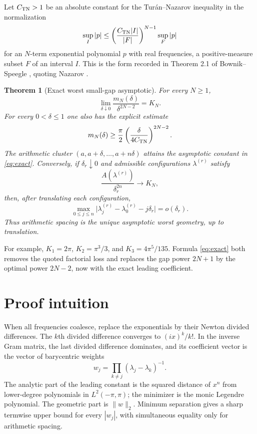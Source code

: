 \documentclass[11pt]{article}
\newtheorem{theorem}{Theorem}
\begin{document}
Let $C_{\rm TN}>1$ be an absolute constant for the Tur\'an--Nazarov inequality in the normalization
\begin{equation}\label{eq:TN}
 \sup_I |p|\leq
 \left(\frac{C_{\rm TN}|I|}{|F|}\right)^{N-1}\sup_F|p|
\end{equation}
for an $N$-term exponential polynomial $p$ with real frequencies, a positive-measure subset $F$ of an interval $I$.  This is the form recorded in Theorem 2.1 of Bownik--Speegle \cite{BownikSpeegle}, quoting Nazarov \cite{Nazarov}.

\begin{theorem}[Exact worst small-gap asymptotic]\label{thm:main}
For every $N\geq1$,
\begin{equation}\label{eq:exact}
 \boxed{\displaystyle
 \lim_{\delta\downarrow0}\frac{m_N(\delta)}{\delta^{2N-2}}
 =K_N.}
\end{equation}
For every $0<\delta\leq1$ one also has the explicit estimate
\begin{equation}\label{eq:explicit}
 m_N(\delta)\geq \frac{\pi}{2}
 \left(\frac{\delta}{4C_{\rm TN}}\right)^{2N-2}.
\end{equation}
The arithmetic cluster $(a,a+\delta,\ldots,a+n\delta)$ attains the asymptotic constant in \eqref{eq:exact}.  Conversely, if $\delta_r\downarrow0$ and admissible configurations $\lambda^{(r)}$ satisfy
\[
 \frac{A(\lambda^{(r)})}{\delta_r^{2n}}\longrightarrow K_N,
\]
then, after translating each configuration,
\begin{equation}\label{eq:rigidity}
 \max_{0\leq j\leq n}
 \bigl|\lambda_j^{(r)}-\lambda_0^{(r)}-j\delta_r\bigr|
 =o(\delta_r).
\end{equation}
Thus arithmetic spacing is the unique asymptotic worst geometry, up to translation.
\end{theorem}

For example, $K_1=2\pi$, $K_2=\pi^3/3$, and $K_3=4\pi^5/135$.  Formula \eqref{eq:exact} both removes the quoted factorial loss and replaces the gap power $2N+1$ by the optimal power $2N-2$, now with the exact leading coefficient.

\section{Proof intuition}

When all frequencies coalesce, replace the exponentials by their Newton divided differences.  The $k$th divided difference converges to $(ix)^k/k!$.  In the inverse Gram matrix, the last divided difference dominates, and its coefficient vector is the vector of barycentric weights
\[
 w_j=\prod_{k\ne j}(\lambda_j-\lambda_k)^{-1}.
\]
The analytic part of the leading constant is the squared distance of $x^n$ from lower-degree polynomials in $L^2(-\pi,\pi)$; the minimizer is the monic Legendre polynomial.  The geometric part is $\|w\|_2$.  Minimum separation gives a sharp termwise upper bound for every $|w_j|$, with simultaneous equality only for arithmetic spacing.
\end{document}
